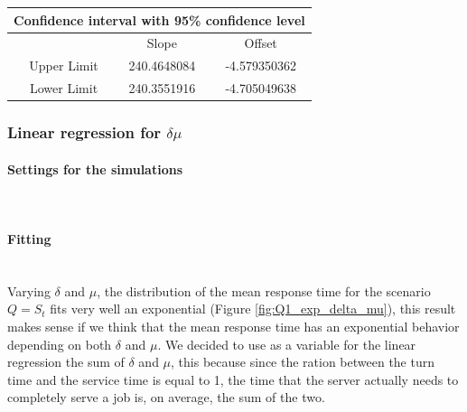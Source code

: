 \documentclass{article}
\begin{document}
                    \begin{table}[htbp]
                        \centering 
                        \begin{tabular}{|c|c|c|}
                            
                            \hline
                            \multicolumn{3}{|c|}{\bf Confidence interval with 95\% confidence level} \\
                            
                            \hline
                            \ & Slope & Offset\\
                            \hline
                            \ Upper Limit & 240.4648084 & -4.579350362 \\ 
                            \hline
                            \ Lower Limit & 240.3551916 & -4.705049638 \\ 
                            \hline
                        \end{tabular}
                        \label{table:CI_1_fitting_mu}
                    \end{table}
                    
            \subsubsection{Linear regression for $\delta \mu$}
                \paragraph{Settings for the simulations} \hfill \\
                    
                \paragraph{Fitting} \hfill \\

                    Varying $\delta$ and $\mu$, the distribution of the mean response time for the scenario $Q = S_t$ fits very well an exponential (Figure \ref{fig:Q1_exp_delta_mu}), this result makes sense if we think that the mean response time has an exponential behavior depending on both $\delta$ and $\mu$. We decided to use as a variable for the linear regression the sum of $\delta$ and $\mu$, this because since the ration between the turn time and the service time is equal to 1, the time that the server actually needs to completely serve a job is, on average, the sum of the two.
                     
\end{document}
